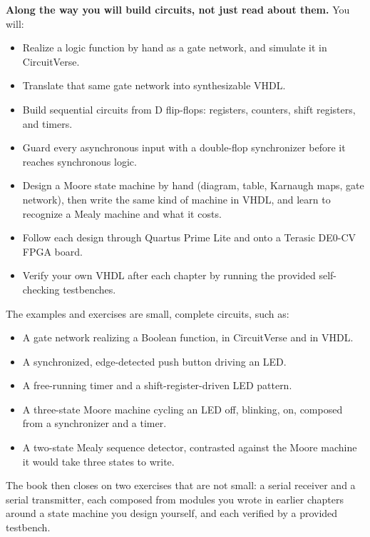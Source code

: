\textbf{Along the way you will build circuits, not just read about them.} You will:
\begin{itemize}
  \item Realize a logic function by hand as a gate network, and simulate it in CircuitVerse.
  \item Translate that same gate network into synthesizable VHDL.
  \item Build sequential circuits from D flip-flops: registers, counters, shift registers, and
    timers.
  \item Guard every asynchronous input with a double-flop synchronizer before it reaches synchronous
    logic.
  \item Design a Moore state machine by hand (diagram, table, Karnaugh maps, gate network), then
    write the same kind of machine in VHDL, and learn to recognize a Mealy machine and what it
    costs.
  \item Follow each design through Quartus Prime Lite and onto a Terasic DE0-CV FPGA board.
  \item Verify your own VHDL after each chapter by running the provided self-checking testbenches.
\end{itemize}
The examples and exercises are small, complete circuits, such as:
\begin{itemize}
  \item A gate network realizing a Boolean function, in CircuitVerse and in VHDL.
  \item A synchronized, edge-detected push button driving an LED.
  \item A free-running timer and a shift-register-driven LED pattern.
  \item A three-state Moore machine cycling an LED off, blinking, on, composed from a synchronizer
    and a timer.
  \item A two-state Mealy sequence detector, contrasted against the Moore machine it would take
    three states to write.
\end{itemize}
The book then closes on two exercises that are not small: a serial receiver and a serial
transmitter, each composed from modules you wrote in earlier chapters around a state machine you
design yourself, and each verified by a provided testbench.

